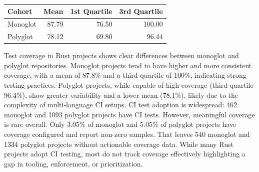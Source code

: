 \documentclass[11pt]{article}
\begin{document}
\begin{center}
\begin{tabular}{lrrr}
Cohort & Mean & 1st Quartile & 3rd Quartile\\
\hline
Monoglot & 87.79 & 76.50 & 100.00\\
Polyglot & 78.12 & 69.80 & 96.44\\
\end{tabular}
\end{center}
Test coverage in Rust projects shows clear differences between monoglot and polyglot repositories. Monoglot projects tend to have higher and more consistent coverage, with a mean of 87.8\% and a third quartile of 100\%, indicating strong testing practices. Polyglot projects, while capable of high coverage (third quartile 96.4\%), show greater variability and a lower mean (78.1\%), likely due to the complexity of multi-language CI setups. CI test adoption is widespread: 462 monoglot and 1093 polyglot projects have CI tests. However, meaningful coverage is rare overall. Only 3.05\% of monoglot and 5.05\% of polyglot projects have coverage configured and report non-zero samples. That leaves 540 monoglot and 1334 polyglot projects without actionable coverage data. While many Rust projects adopt CI testing, most do not track coverage effectively highlighting a gap in tooling, enforcement, or prioritization.
\end{document}
